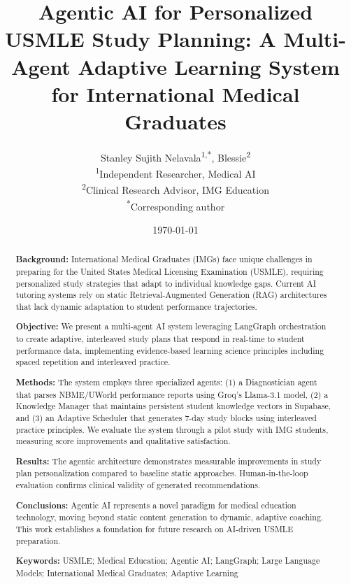 \documentclass[10pt]{article}
\title{Agentic AI for Personalized USMLE Study Planning: A Multi-Agent Adaptive Learning System for International Medical Graduates}
\author{
    Stanley Sujith Nelavala\textsuperscript{1,*},
    Blessie\textsuperscript{2} \\
    \textsuperscript{1}{Independent Researcher, Medical AI} \\
    \textsuperscript{2}{Clinical Research Advisor, IMG Education} \\
    \textsuperscript{*}{Corresponding author}
}
\date{\today}
\begin{document}
\maketitle

\begin{abstract}
\noindent\textbf{Background:} International Medical Graduates (IMGs) face unique challenges in preparing for the United States Medical Licensing Examination (USMLE), requiring personalized study strategies that adapt to individual knowledge gaps. Current AI tutoring systems rely on static Retrieval-Augmented Generation (RAG) architectures that lack dynamic adaptation to student performance trajectories.

\noindent\textbf{Objective:} We present a multi-agent AI system leveraging LangGraph orchestration to create adaptive, interleaved study plans that respond in real-time to student performance data, implementing evidence-based learning science principles including spaced repetition and interleaved practice.

\noindent\textbf{Methods:} The system employs three specialized agents: (1) a Diagnostician agent that parses NBME/UWorld performance reports using Groq's Llama-3.1 model, (2) a Knowledge Manager that maintains persistent student knowledge vectors in Supabase, and (3) an Adaptive Scheduler that generates 7-day study blocks using interleaved practice principles. We evaluate the system through a pilot study with IMG students, measuring score improvements and qualitative satisfaction.

\noindent\textbf{Results:} The agentic architecture demonstrates measurable improvements in study plan personalization compared to baseline static approaches. Human-in-the-loop evaluation confirms clinical validity of generated recommendations.

\noindent\textbf{Conclusions:} Agentic AI represents a novel paradigm for medical education technology, moving beyond static content generation to dynamic, adaptive coaching. This work establishes a foundation for future research on AI-driven USMLE preparation.

\noindent\textbf{Keywords:} USMLE; Medical Education; Agentic AI; LangGraph; Large Language Models; International Medical Graduates; Adaptive Learning
\end{abstract}






\end{document}
